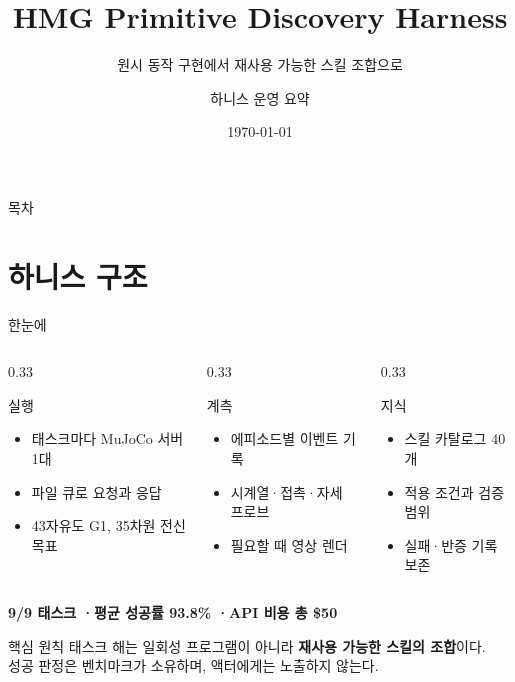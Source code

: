 \documentclass[aspectratio=169,10pt]{beamer}
\title[HMG Harness]{HMG Primitive Discovery Harness}
\subtitle{원시 동작 구현에서 재사용 가능한 스킬 조합으로}
\author{하니스 운영 요약}
\date{\today}
\begin{document}
\begin{frame}
  \titlepage
\end{frame}

\begin{frame}{목차}
  \tableofcontents
\end{frame}

\section{하니스 구조}

\begin{frame}{한눈에}
  \begin{columns}[T]
    \begin{column}{0.33\textwidth}
      \begin{block}{실행}
        \begin{itemize}
          \item 태스크마다 MuJoCo 서버 1대
          \item 파일 큐로 요청과 응답
          \item 43자유도 G1, 35차원 전신 목표
        \end{itemize}
      \end{block}
    \end{column}
    \begin{column}{0.33\textwidth}
      \begin{block}{계측}
        \begin{itemize}
          \item 에피소드별 이벤트 기록
          \item 시계열·접촉·자세 프로브
          \item 필요할 때 영상 렌더
        \end{itemize}
      \end{block}
    \end{column}
    \begin{column}{0.33\textwidth}
      \begin{block}{지식}
        \begin{itemize}
          \item 스킬 카탈로그 40개
          \item 적용 조건과 검증 범위
          \item 실패·반증 기록 보존
        \end{itemize}
      \end{block}
    \end{column}
  \end{columns}

  \vspace{0.4em}
  \centering
  \textbf{9/9 태스크 \quad·\quad 평균 성공률 93.8\% \quad·\quad API 비용 총 \$50}

  \vspace{0.6em}
  \begin{block}{핵심 원칙}
    태스크 해는 일회성 프로그램이 아니라 \textbf{재사용 가능한 스킬의 조합}이다.\\
    성공 판정은 벤치마크가 소유하며, 액터에게는 노출하지 않는다.
  \end{block}
\end{frame}
\end{document}
